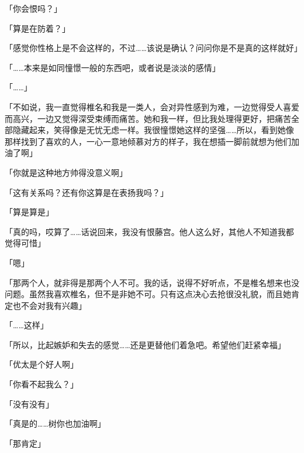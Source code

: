 「你会恨吗？」

「算是在防着？」

「感觉你性格上是不会这样的，不过……该说是确认？问问你是不是真的这样就好」

「……本来是如同憧憬一般的东西吧，或者说是淡淡的感情」

「……」

「不如说，我一直觉得椎名和我是一类人，会对异性感到为难，一边觉得受人喜爱而高兴，一边又觉得深受束缚而痛苦。她和我一样，但比我处理得更好，把痛苦全部隐藏起来，笑得像是无忧无虑一样。我很憧憬她这样的坚强……所以，看到她像那样找到了喜欢的人，一心一意地倾慕对方的样子，我在想插一脚前就想为他们加油了啊」

「你就是这种地方帅得没意义啊」

「这有关系吗？还有你这算是在表扬我吗？」

「算是算是」

「真的吗，哎算了……话说回来，我没有恨藤宫。他人这么好，其他人不知道我都觉得可惜」

「嗯」

「那两个人，就非得是那两个人不可。我的话，说得不好听点，不是椎名想来也没问题。虽然我喜欢椎名，但不是非她不可。只有这点决心去抢很没礼貌，而且她肯定也不会对我有兴趣」

「……这样」

「所以，比起嫉妒和失去的感觉……还是更替他们着急吧。希望他们赶紧幸福」

「优太是个好人啊」

「你看不起我么？」

「没有没有」

「真是的……树你也加油啊」

「那肯定」
